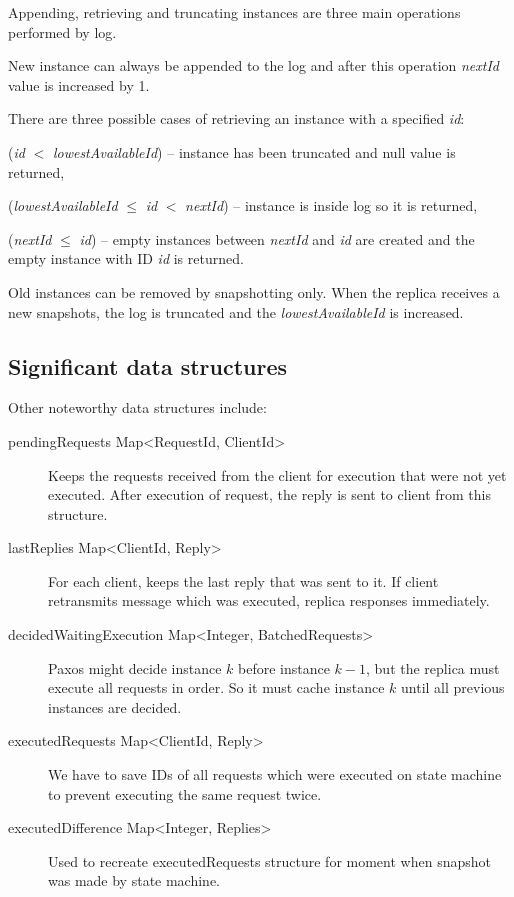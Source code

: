Appending, retrieving and truncating instances are three main operations per\-for\-med by log.

New instance can always be appended to the log and after this operation \textit{nextId} value is increased by 1. 

\noindent There are three possible cases of retrieving an instance with a specified \textit{id}:
\begin{tightList}
  \item[\textbullet] (\textit{id} $<$ \textit{lowestAvailableId}) -- instance has been truncated and null value is returned,
  \item[\textbullet] (\textit{lowestAvailableId} $\leq$ \textit{id} $<$ \textit{nextId}) -- instance is inside log so it is returned,
  \item[\textbullet] (\textit{nextId} $\leq$ \textit{id}) -- empty instances between \textit{nextId} and \textit{id} are created and the empty instance with ID \textit{id} is returned.
\end{tightList}

\noindent Old instances can be removed by snapshotting only. When the replica receives a new snapshots, the log is truncated and the \textit{lowestAvailableId} is increased.



\subsection{Significant data structures}


Other noteworthy data structures include:
\label{subsubsec:significant_structures}
  \begin{description}
    \item[pendingRequests Map\textless RequestId, ClientId\textgreater] Keeps the requests received from the client for execution that were not yet executed. After execution of request, the reply is sent to client from this structure.
    \item[lastReplies Map\textless ClientId, Reply\textgreater] For each client, keeps the last reply that was sent to it. If client retransmits message which was executed, replica responses immediately.
    \item[decidedWaitingExecution Map\textless Integer, BatchedRequests\textgreater] Paxos might decide in\-stan\-ce $k$ before instance $k-1$, but the replica must execute all requests in order. So it must cache in\-stan\-ce $k$ until all previous instances are decided.
    \item[executedRequests Map\textless ClientId, Reply\textgreater] We have to save IDs of all requests which were executed on state machine to prevent executing the same request twice.
	\item[executedDifference Map\textless Integer, Replies\textgreater] Used to recreate executedRequests stru\-ctu\-re for moment when snapshot was made by state machine.
  \end{description}



